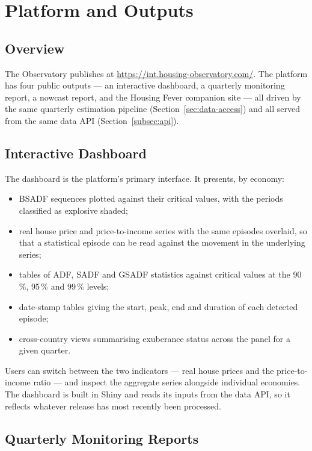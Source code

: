 \section{Platform and Outputs}
\label{sec:website}

\subsection{Overview}

The Observatory publishes at \url{https://int.housing-observatory.com/}.
The platform has four public outputs --- an interactive dashboard, a
quarterly monitoring report, a nowcast report, and the Housing Fever
companion site --- all driven by the same quarterly estimation pipeline
(Section~\ref{sec:data-access}) and all served from the same data API
(Section~\ref{subsec:api}).

\subsection{Interactive Dashboard}

The dashboard is the platform's primary interface. It presents, by economy:

\begin{itemize}
  \item BSADF sequences plotted against their critical values, with the
        periods classified as explosive shaded;
  \item real house price and price-to-income series with the same episodes
        overlaid, so that a statistical episode can be read against the
        movement in the underlying series;
  \item tables of ADF, SADF and GSADF statistics against critical values at
        the 90\,\%, 95\,\% and 99\,\% levels;
  \item date-stamp tables giving the start, peak, end and duration of each
        detected episode;
  \item cross-country views summarising exuberance status across the panel
        for a given quarter.
\end{itemize}

Users can switch between the two indicators --- real house prices and the
price-to-income ratio --- and inspect the aggregate series alongside
individual economies. The dashboard is built in Shiny and reads its inputs
from the data API, so it reflects whatever release has most recently been
processed.

\subsection{Quarterly Monitoring Reports}

